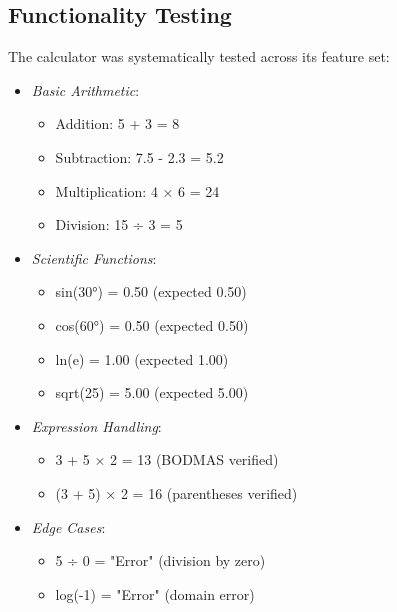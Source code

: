 \documentclass{article}
\begin{document}
\subsection{Functionality Testing}
The calculator was systematically tested across its feature set:

\begin{itemize}[leftmargin=*]
    \item \textit{Basic Arithmetic}:
    \begin{itemize}[leftmargin=*]
        \item Addition: 5 + 3 = 8
        \item Subtraction: 7.5 - 2.3 = 5.2
        \item Multiplication: 4 × 6 = 24
        \item Division: 15 ÷ 3 = 5
    \end{itemize}
    
    \item \textit{Scientific Functions}:
    \begin{itemize}[leftmargin=*]
        \item sin(30°) = 0.50 (expected 0.50)
        \item cos(60°) = 0.50 (expected 0.50)
        \item ln(e) = 1.00 (expected 1.00)
        \item sqrt(25) = 5.00 (expected 5.00)
    \end{itemize}
    
    \item \textit{Expression Handling}:
    \begin{itemize}[leftmargin=*]
        \item 3 + 5 × 2 = 13 (BODMAS verified)
        \item (3 + 5) × 2 = 16 (parentheses verified)
    \end{itemize}
    
    \item \textit{Edge Cases}:
    \begin{itemize}[leftmargin=*]
        \item 5 ÷ 0 = "Error" (division by zero)
        \item log(-1) = "Error" (domain error)
    \end{itemize}
\end{itemize}
\end{document}
